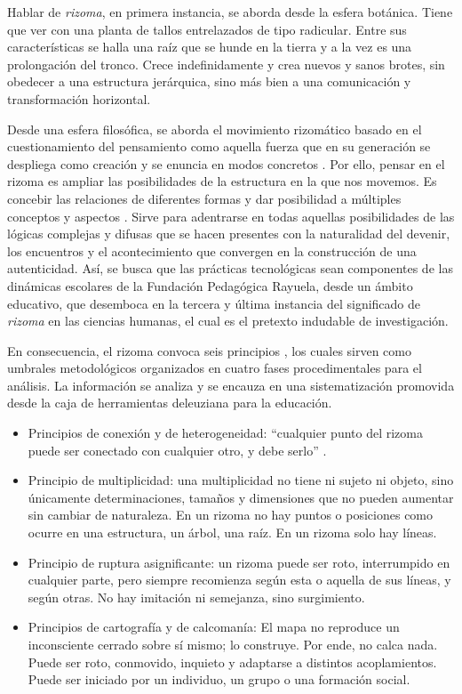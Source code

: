 \documentclass{textolivre}
\begin{document}
Hablar de \textit{rizoma}, en primera instancia, se aborda desde la esfera botánica. Tiene que ver con una planta de tallos entrelazados de tipo radicular. Entre sus características se halla una raíz que se hunde en la tierra y a la vez es una prolongación del tronco. Crece indefinidamente y crea nuevos y sanos brotes, sin obedecer a una estructura jerárquica, sino más bien a una comunicación y transformación horizontal. 

Desde una esfera filosófica, se aborda el movimiento rizomático basado en el cuestionamiento del pensamiento como aquella fuerza que en su generación se despliega como creación y se enuncia en modos concretos \cite{rangel_ecosofi:_2007}. Por ello, pensar en el rizoma es ampliar las posibilidades de la estructura en la que nos movemos. Es concebir las relaciones de diferentes formas y dar posibilidad a múltiples conceptos y aspectos \cite{fundacion_pedagogica_rayuela_proyecto_2019}. Sirve para adentrarse en todas aquellas posibilidades de las lógicas complejas y difusas que se hacen presentes con la naturalidad del devenir, los encuentros y el acontecimiento que convergen en la construcción de una autenticidad. Así, se busca que las prácticas tecnológicas sean componentes de las dinámicas escolares de la Fundación Pedagógica Rayuela, desde un ámbito educativo, que desemboca en la tercera y última instancia del significado de \textit{rizoma} en las ciencias humanas, el cual es el pretexto indudable de investigación.

En consecuencia, el rizoma convoca seis principios \cite{deleuze_mil_1980, perez_de_lama_avispa_2009}, los cuales sirven como umbrales metodológicos organizados en cuatro fases procedimentales para el análisis. La información se analiza y se encauza en una sistematización promovida desde la caja de herramientas deleuziana para la educación. 

\begin{itemize}
    \item Principios de conexión y de heterogeneidad: “cualquier punto del rizoma puede ser conectado con cualquier otro, y debe serlo” \cite[p. 13]{deleuze_mil_1980}.
    \item Principio de multiplicidad: una multiplicidad no tiene ni sujeto ni objeto, sino únicamente determinaciones, tamaños y dimensiones que no pueden aumentar sin cambiar de naturaleza. En un rizoma no hay puntos o posiciones como ocurre en una estructura, un árbol, una raíz. En un rizoma solo hay líneas.
    \item Principio de ruptura asignificante: un rizoma puede ser roto, interrumpido en cualquier parte, pero siempre recomienza según esta o aquella de sus líneas, y según otras. No hay imitación ni semejanza, sino surgimiento.
    \item Principios de cartografía y de calcomanía: El mapa no reproduce un inconsciente cerrado sobre sí mismo; lo construye. Por ende, no calca nada. Puede ser roto, conmovido, inquieto y adaptarse a distintos acoplamientos. Puede ser iniciado por un individuo, un grupo o una formación social.
\end{itemize}
\end{document}
